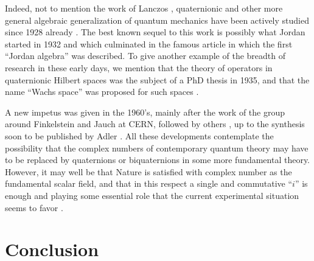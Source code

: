 \documentclass [12pt,a4paper      ]{article}
\begin{document}
     Indeed,   not   to  mention  the  work  of  Lanczos \cite{R26,R38}, 
quaternionic  and other more general algebraic generalization  of 
quantum mechanics have been actively studied since 1928 already \cite{R50}. The 
best  known  sequel  to this work is possibly  what  Jordan  \cite{R51} 
started  in 1932 and which culminated in the famous article  \cite{R52} 
in  which  the  first ``Jordan algebra''  was  described.  To  give 
another example of the breadth of research in these early days,  we 
mention that the theory of operators in quaternionic Hilbert spaces 
was the subject of a PhD thesis in 1935, and that the name ``Wachs 
space'' was proposed for such spaces \cite{R53}.

     A new impetus was given in the 1960's, mainly after the work  
of the group around Finkelstein and Jauch \cite{R54} at CERN,  followed 
by others \cite{R55}, up to the synthesis soon to be published by Adler 
\cite{R56}. All these developments contemplate the possibility that the 
complex  numbers  of contemporary quantum theory may have  to  be 
replaced by quaternions or biquaternions in some more fundamental 
theory.  However, it  may well be that Nature is satisfied with complex 
number as the fundamental scalar field,  and that in this respect 
a single and commutative ``$i$'' is enough and playing some essential role
that the current experimental situation seems to favor \cite{R57,R58}.
 


\section{Conclusion}
\label{con:0}
\end{document}

